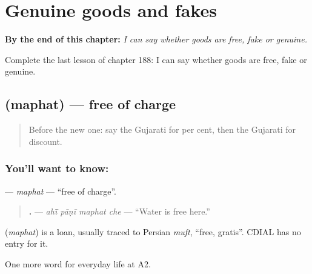 
\chapter{Genuine goods and fakes}
\label{ch:gu-genuine-goods-and-fakes}

\begin{chapteropening}
\textbf{By the end of this chapter:} \emph{I can say whether goods are free, fake or genuine.}

Complete the last lesson of chapter 188: I can say whether goods are free, fake or genuine.
\end{chapteropening}

\section[\texorpdfstring{\gu{મફત} (maphat)}{મફત (maphat)}]{ (maphat) — free of charge}

\label{lesson:GU-C188-maphat}



\begin{quote}
Before the new one: say the Gujarati for per cent, then the Gujarati for discount.
\end{quote}

\subsection*{You'll want to know: }
\textbf{} — \emph{maphat} — \textquotedblleft{}free of charge\textquotedblright{}.

\begin{quote}
\textbf{   .} — \emph{ahī̃ pāṇī maphat che} — \textquotedblleft{}Water is free here.\textquotedblright{}
\end{quote}

\begin{cousinweb}
\textbf{} (\emph{maphat}) is a loan, usually traced to Persian \emph{muft}, \textquotedblleft{}free, gratis\textquotedblright{}. CDIAL has no entry for it.
\end{cousinweb}

\begin{grammarlens}[title={What you've built}]
One more word for everyday life at A2.
\end{grammarlens}

